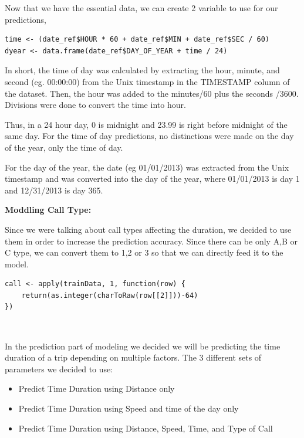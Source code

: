 \documentclass[11pt]{article}
\begin{document}
\par
Now that we have the essential data, we can create 2 variable to use for our predictions, 
\begin{lstlisting}
time <- (date_ref$HOUR * 60 + date_ref$MIN + date_ref$SEC / 60)
dyear <- data.frame(date_ref$DAY_OF_YEAR + time / 24)  
\end{lstlisting}

\par
In short, the time of day was calculated by extracting the hour, minute, and second (eg. 00:00:00) from the Unix timestamp in the TIMESTAMP column of the dataset. Then, the hour was added to the minutes/60 plus the seconds /3600. Divisions were done to convert the time into hour.

\par
Thus, in a 24 hour day, 0 is midnight and 23.99 is right before midnight of the same day. For the time of day predictions, no distinctions were made on the day of the year, only the time of day. 
\par
For the day of the year, the date (eg 01/01/2013) was extracted from the Unix timestamp and was converted into the day of the year, where 01/01/2013 is day 1 and 12/31/2013 is day 365. 

\textbf{Moddling Call Type:}
\par
Since we were talking about call types affecting the duration, we decided to use them in order to increase the prediction accuracy. Since there can be only A,B or C type, we can convert them to 1,2 or 3 so that we can directly feed it to the model.

\begin{lstlisting}
call <- apply(trainData, 1, function(row) {
	return(as.integer(charToRaw(row[[2]]))-64)
})
\end{lstlisting}

\\
\par
In the prediction part of modeling we decided we will be predicting the time duration of a trip depending on multiple factors. The 3 different sets of parameters we decided to use:
\begin{itemize}
	\item Predict Time Duration using Distance only
	\item Predict Time Duration using Speed and time of the day only
	\item Predict Time Duration using Distance, Speed, Time, and Type of Call
\end{itemize}
\end{document}
